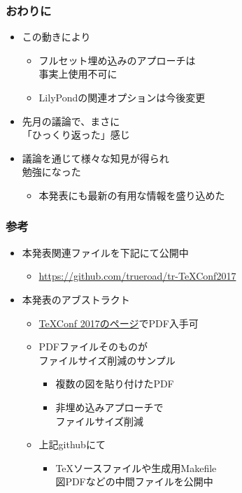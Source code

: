 \documentclass[unicode,17pt]{beamer}
\begin{document}
\begin{frame}\frametitle{おわりに}
  \begin{itemize}
  \item この動きにより
    \begin{itemize}
    \item フルセット埋め込みのアプローチは\\
      事実上使用不可に
    \item LilyPondの関連オプションは今後変更
    \end{itemize}
  \item 先月の議論で、まさに\\
    「ひっくり返った」感じ
  \item 議論を通じて様々な知見が得られ\\
    勉強になった
    \begin{itemize}
    \item 本発表にも最新の有用な情報を盛り込めた
    \end{itemize}
  \end{itemize}
\end{frame}

\begin{frame}\frametitle{参考}
  \begin{itemize}
  \item 本発表関連ファイルを下記にて公開中
    \begin{itemize}
    \item \url{https://github.com/trueroad/tr-TeXConf2017}
    \end{itemize}
  \item 本発表のアブストラクト
    \begin{itemize}
    \item \href{https://texconf2017.tumblr.com/}%
      {TeXConf 2017のページ}でPDF入手可
    \item PDFファイルそのものが\\
      ファイルサイズ削減のサンプル
      \begin{itemize}
      \item 複数の図を貼り付けたPDF
      \item 非埋め込みアプローチで\\
        ファイルサイズ削減
      \end{itemize}
    \item 上記githubにて
      \begin{itemize}
      \item \TeX ソースファイルや生成用Makefile\\
        図PDFなどの中間ファイルを公開中
      \end{itemize}
    \end{itemize}
  \end{itemize}
\end{frame}
\end{document}
